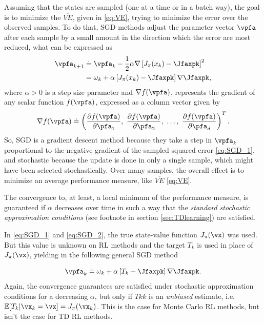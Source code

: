 Assuming that the states are sampled (one at a time or in a batch way), the goal is to minimize the $\overline{VE}$, given in \eqref{eq:VE}, trying to minimize the error over the observed samples.
To do that, SGD methods adjust the parameter vector $\vpfa$ after each sample by a small amount in the direction which the error are most reduced, what can be expressed as
 \begin{align}
   \vpfa_{k+1} &\doteq \vpfa_k -\frac{1}{2}\alpha\nabla\left[J_\pi(x_k)-\Jfaxpk\right]^2 \label{eq:SGD_1}\\
            &= \omega_k + \alpha \left[J_\pi(x_k) - \Jfaxpk\right]\nabla\Jfaxpk
   \label{eq:SGD_2},
\end{align}
where $\alpha > 0$ is a step size parameter and $\nabla f(\vpfa)$, represents the gradient of any scalar function $f(\vpfa)$, expressed as a column vector given by
 \begin{equation}
  \nabla f(\vpfa) \doteq \left(\frac{\partial f(\vpfa)}{\partial\pfa_1},\ \frac{\partial f(\vpfa)}{\partial\pfa_2},\ \dots,\ \frac{\partial f(\vpfa)}{\partial\pfa_d} \right)^T
  \label{eq:grad}.
\end{equation}
So, SGD is a gradient descent method because they take a step in $\vpfa_k$ proportional to the negative gradient of the sampled squared error \eqref{eq:SGD_1}, and stochastic because the update is done in only a single sample, which might have been selected stochastically.
Over many samples, the overall effect is to minimize an average performance measure, like $\overline{VE}$ \eqref{eq:VE}.

The convergence to, at least, a local minimum of the performance measure, is guaranteed if $\alpha$ decreases over time in such a way that the  \textit{standard stochastic approximation conditions} (see footnote in section \eqref{sec:TDlearning}) are satisfied.

In \eqref{eq:SGD_1} and \eqref{eq:SGD_2}, the true state-value function $J_\pi(\vx)$ was used.
But this value is unknown on RL methods and the target $T_k$ is used in place of  $J_\pi(\vx)$, yielding in the following general SGD method 

\begin{equation}
\vpfa_k \doteq \omega_k + \alpha \left[T_k - \Jfaxpk\right]\nabla\Jfaxpk
\label{eq:genSGD}.
\end{equation}
Again, the convergence guarantees are satisfied under stochastic approximation conditions for a decreasing $\alpha$, but only if $Tkk$ is an  \textit{unbiased} estimate, i.e. $ \mathbb{E}[T_k|\vx_k=\vx] = J_\pi(\vx_k)$.
This is the case for Monte Carlo RL methods, but isn't the case for TD RL methods.

